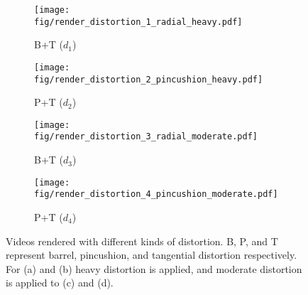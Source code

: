     \begin{figure}[t]
    	\begin{center}
    		\captionsetup{justification=centering}
    		\begin{subfigure}[t]{0.24\linewidth}
    			\centering
    			\texttt{[image: fig/render\_distortion\_1\_radial\_heavy.pdf]}
    			\caption{B+T ($d_1$)}
    		\end{subfigure}
    		\begin{subfigure}[t]{0.24\linewidth}
    			\centering
    			\texttt{[image: fig/render\_distortion\_2\_pincushion\_heavy.pdf]}
    			\caption{P+T ($d_2$)}
    		\end{subfigure}
    		\begin{subfigure}[t]{0.24\linewidth}
    			\centering
    			\texttt{[image: fig/render\_distortion\_3\_radial\_moderate.pdf]}
    			\caption{B+T ($d_3$)}
    		\end{subfigure}
    		\begin{subfigure}[t]{0.24\linewidth}
    			\centering
    			\texttt{[image: fig/render\_distortion\_4\_pincushion\_moderate.pdf]}
    			\caption{P+T ($d_4$)}
    		\end{subfigure}
    		\vspace{-1mm}
    	\end{center}
    	    \vspace{-5mm}
    		\caption{Videos rendered with different kinds of distortion. B, P, and T represent barrel, pincushion, and tangential distortion respectively. For (a) and (b) heavy distortion is applied, and moderate distortion is applied to (c) and (d).}
    		\vspace{-4mm}
    	\label{fig:dataset_distorted}
    \end{figure}

